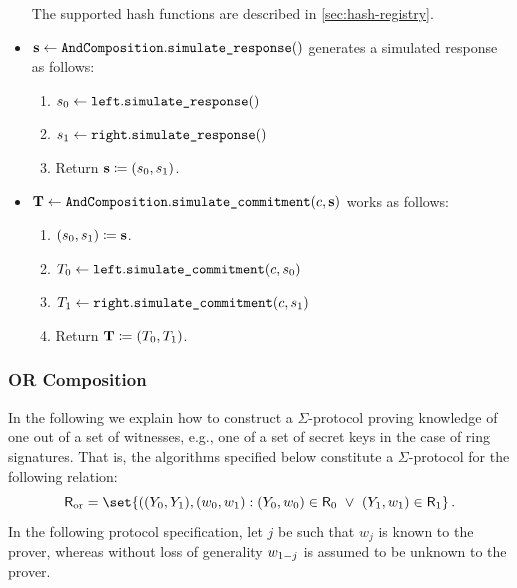 \documentclass[11pt]{article}
\begin{document}
\begin{itemize}
\[   \]
   The supported hash functions are described in \cref{sec:hash-registry}.
  \item
  $\mathbf {s} \gets \texttt{AndComposition}.\texttt{simulate\_response}()$
   generates a simulated response as follows:
    \begin{enumerate}
      \item
        $s_0\gets\texttt{left}.\texttt{simulate\_response}()$
        \item $s_1\gets\texttt{right}.\texttt{simulate\_response}()$
      \item
        Return $\mathbf {s}\coloneqq(s_0,s_1)$.
    \end{enumerate}
  \item
  $\mathbf {T} \gets \texttt{AndComposition}.\texttt{simulate\_commitment}(c, \mathbf {s})$ works as follows:
    \begin{enumerate}
      \item
        $(s_0,s_1)\coloneqq\mathbf{s}$.
      \item
        $T_0\gets\texttt{left}.\texttt{simulate\_commitment}(c,s_0)$
        \item $T_1\gets\texttt{right}.\texttt{simulate\_commitment}(c,s_1)$
      \item
        Return $\mathbf {T}\coloneqq(T_0, T_1)$.
      \end{enumerate}
\end{itemize}



\subsubsection{OR Composition}

  In the following we explain how to construct a $\Sigma$-protocol proving knowledge of one out of a set of witnesses, e.g., one of a set of secret keys in the case of ring signatures.
  That is, the algorithms specified below constitute a $\Sigma$-protocol for the following relation:
\[
  \orrelation = \set{
    ((\statement_0,\statement_1),(\witness_0,\witness_1) :
    (\statement_0,\witness_0)\in \relation_0 ~\lor~ (\statement_1,\witness_1)\in\relation_1}\,.
\]
  In the following protocol specification, let $j$ be such that $w_j$ is known to the prover, whereas without loss of generality $w_{1-j}$ is assumed to be unknown to the prover.
\end{document}

